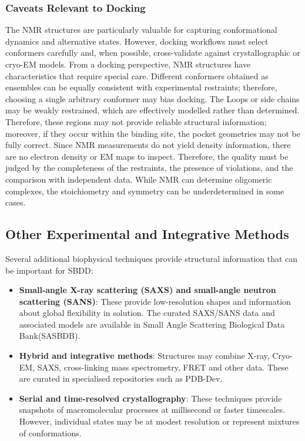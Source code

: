 \documentclass[12pt]{article}
\begin{document}
\subsubsection{Caveats Relevant to Docking}
The NMR structures are particularly valuable for capturing conformational dynamics and alternative states. However, docking workflows must select conformers carefully and, when possible, cross-validate against crystallographic or cryo-EM models. From a docking perspective, NMR structures have characteristics that require special care. Different conformers obtained as ensembles can be equally consistent with experimental restraints; therefore, choosing a single arbitrary conformer may bias docking. The Loops or side chains may be weakly restrained, which are effectively modelled rather than determined. Therefore, these regions may not provide reliable structural information; moreover, if they occur within the binding site, the pocket geometries may not be fully correct. Since NMR measurements do not yield density information, there are no electron density or EM maps to inspect. Therefore, the quality must be judged by the completeness of the restraints, the presence of violations, and the comparison with independent data.  While NMR can determine oligomeric complexes, the stoichiometry and symmetry can be underdetermined in some cases.


\subsection{Other Experimental and Integrative Methods}
Several additional biophysical techniques provide structural information that can be important for SBDD:
\begin{itemize}
  \item \textbf{Small-angle X-ray scattering (SAXS) and small-angle neutron scattering (SANS)}: These provide low-resolution shapes and information about global flexibility in solution. The curated SAXS/SANS data and associated models are available in Small Angle Scattering Biological Data Bank(SASBDB)\cite{CH4_Valentini2015_SASBDB,CH4_pesce2021refining}.
  \item \textbf{Hybrid and integrative methods}: Structures may combine X-ray, Cryo-EM, SAXS, cross-linking mass spectrometry, FRET and other data. These are curated in specialised repositories such as PDB-Dev.\cite{CH4_pesce2021refining}
  \item \textbf{Serial and time-resolved crystallography}: These techniques provide snapshots of macromolecular processes at millisecond or faster timescales. However, individual states may be at modest resolution or represent mixtures of conformations.
\end{itemize}
\end{document}
